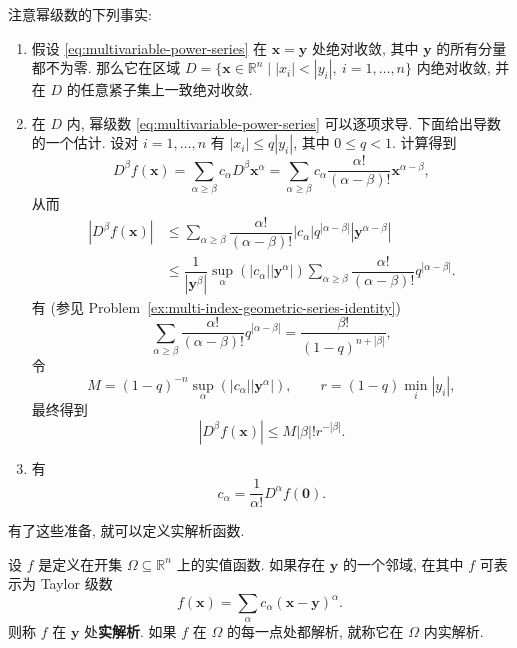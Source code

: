 注意幂级数的下列事实:
\begin{enumerate}
\item 假设 \eqref{eq:multivariable-power-series} 在 $\bm{x}=\bm{y}$ 处绝对收敛, 其中 $\bm{y}$ 的所有分量都不为零. 那么它在区域 $D=\{\bm{x}\in\mathbb{R}^n\mid |x_i|<|y_i|,\ i=1,\ldots,n\}$ 内绝对收敛, 并在 $D$ 的任意紧子集上一致绝对收敛.
\item 在 $D$ 内, 幂级数 \eqref{eq:multivariable-power-series} 可以逐项求导. 下面给出导数的一个估计. 设对 $i=1,\ldots,n$ 有 $|x_i|\leq q|y_i|$, 其中 $0\leq q<1$. 计算得到
\begin{equation}\label{eq:power-series-termwise-derivative}
D^\beta f(\bm{x})=\sum_{\alpha\geq\beta}c_\alpha D^\beta\bm{x}^{\alpha}=\sum_{\alpha\geq\beta}c_\alpha\dfrac{\alpha!}{(\alpha-\beta)!}\bm{x}^{\alpha-\beta},
\end{equation}
从而
\[
\begin{aligned}
|D^\beta f(\bm{x})|
&\leq\sum_{\alpha\geq\beta}\dfrac{\alpha!}{(\alpha-\beta)!}|c_\alpha|q^{|\alpha-\beta|}|\bm{y}^{\alpha-\beta}|\\
&\leq\dfrac1{|\bm{y}^{\beta}|}\sup_\alpha(|c_\alpha||\bm{y}^{\alpha}|)
\sum_{\alpha\geq\beta}\dfrac{\alpha!}{(\alpha-\beta)!}q^{|\alpha-\beta|}.
\end{aligned}
\]
有 (参见 Problem~\ref{ex:multi-index-geometric-series-identity})
\begin{equation}\label{eq:multi-index-geometric-derivative-sum}
\sum_{\alpha\geq\beta}\dfrac{\alpha!}{(\alpha-\beta)!}q^{|\alpha-\beta|}=\dfrac{\beta!}{(1-q)^{n+|\beta|}},
\end{equation}
令
\begin{equation}\label{eq:power-series-derivative-bound-constants}
M=(1-q)^{-n}\sup_\alpha(|c_\alpha||\bm{y}^{\alpha}|),\qquad r=(1-q)\min_i|y_i|,
\end{equation}
最终得到
\begin{equation}\label{eq:power-series-factorial-derivative-bound}
|D^\beta f(\bm{x})|\leq M|\beta|!r^{-|\beta|}.
\end{equation}
\item 有
\begin{equation}\label{eq:power-series-taylor-coefficients}
c_\alpha=\dfrac1{\alpha!}D^\alpha f(\bm{0}).
\end{equation}
\end{enumerate}

有了这些准备, 就可以定义实解析函数.

\begin{Definition}
\label{def:real-analytic-function}
设 $f$ 是定义在开集 $\Omega\subseteq\mathbb{R}^n$ 上的实值函数. 如果存在 $\bm{y}$ 的一个邻域, 在其中 $f$ 可表示为 Taylor 级数
\begin{equation}\label{eq:real-analytic-local-taylor-series}
f(\bm{x})=\sum_\alpha c_\alpha(\bm{x}-\bm{y})^\alpha.
\end{equation}
则称 $f$ 在 $\bm{y}$ 处\textbf{实解析}. 如果 $f$ 在 $\Omega$ 的每一点处都解析, 就称它在 $\Omega$ 内实解析.
\end{Definition}

